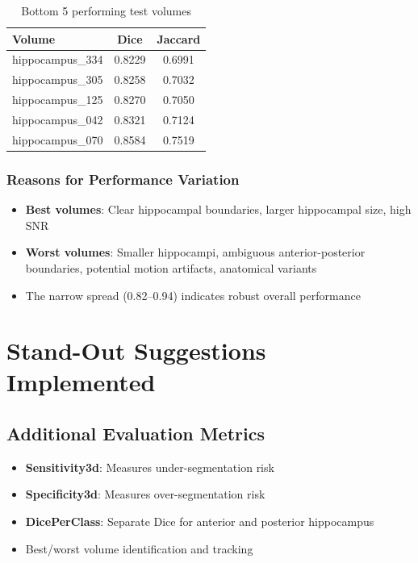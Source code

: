 \documentclass[12pt,a4paper]{report}
\begin{document}
\begin{table}[H]
\centering
\begin{tabular}{lcc}
\toprule
\textbf{Volume} & \textbf{Dice} & \textbf{Jaccard} \\
\midrule
hippocampus\_334 & 0.8229 & 0.6991 \\
hippocampus\_305 & 0.8258 & 0.7032 \\
hippocampus\_125 & 0.8270 & 0.7050 \\
hippocampus\_042 & 0.8321 & 0.7124 \\
hippocampus\_070 & 0.8584 & 0.7519 \\
\bottomrule
\end{tabular}
\caption{Bottom 5 performing test volumes}
\end{table}

\subsection{Reasons for Performance Variation}
\begin{itemize}
    \item \textbf{Best volumes}: Clear hippocampal boundaries, larger hippocampal size, high SNR
    \item \textbf{Worst volumes}: Smaller hippocampi, ambiguous anterior-posterior boundaries, potential motion artifacts, anatomical variants
    \item The narrow spread (0.82--0.94) indicates robust overall performance
\end{itemize}


\chapter{Stand-Out Suggestions Implemented}

\section{Additional Evaluation Metrics}
\begin{itemize}
    \item \textbf{Sensitivity3d}: Measures under-segmentation risk
    \item \textbf{Specificity3d}: Measures over-segmentation risk
    \item \textbf{DicePerClass}: Separate Dice for anterior and posterior hippocampus
    \item Best/worst volume identification and tracking
\end{itemize}
\end{document}
